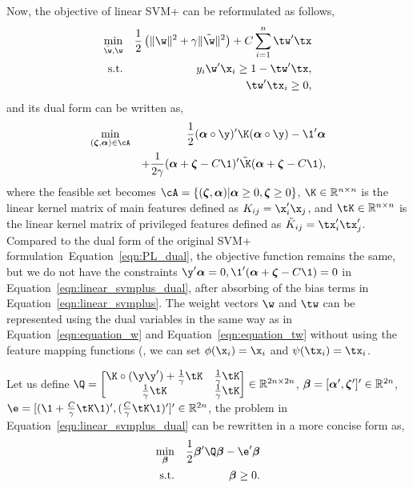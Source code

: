 Now, the objective of linear SVM+ can be reformulated as follows,
\begin{eqnarray}\label{eqn:linear_svmplus}
\min_{\tilde{\w}, \w} && \frac{1}{2}\left(\|\w\|^2 + \gamma\|\tilde{\w}\|^2\right)+ C\sum_{i=1}^{n}\tw'\tx\\
\mbox{s.t.} && y_i\w'\x_i \geq 1 - \tw'\tx,\nonumber\\
&& \tw'\tx_i \geq 0,\nonumber
\end{eqnarray}
and its dual form can be written as,
\begin{eqnarray}\label{eqn:linear_svmplus_dual}
\min_{(\bz, \ba) \in \cA} && \frac{1}{2}(\ba\circ\y)'\K(\ba\circ\y) -\1'\ba  \\
&&  + \frac{1}{2\gamma}(\ba + \bz - C\1)'\tilde{\K}(\ba + \bz - C\1),\nonumber
\end{eqnarray}
where the feasible set becomes $\cA = \{(\bz, \ba)| \ba \geq 0, \bz \geq 0\}$, $\K \in \bbR^{n\times n}$ is the linear kernel matrix of main features defined as $K_{ij} = \x_i'\x_j$, and $\tK\in \bbR^{n\times n}$ is the linear kernel matrix of privileged features defined as $\tilde{K}_{ij} = \tx_i'\tx_j'$. Compared to the dual form of the original SVM+ formulation~Equation~\ref{eqn:PL_dual}, the objective function remains the same, but we do not have the constraints $\y'\ba = 0, \1'(\ba+\bz-C\1) = 0$ in Equation~\ref{eqn:linear_svmplus_dual}, after absorbing of the bias terms in Equation~\ref{eqn:linear_svmplus}. The weight vectors $\w$ and $\tw$ can be represented using the dual variables in the same way as in Equation~\ref{eqn:equation_w} and Equation~\ref{eqn:equation_tw} without using the feature mapping functions (\ie, we can set $\phi(\x_i) = \x_i$ and $\psi(\tx_i) = \tx_i$.

Let us define $\Q = \begin{bmatrix}\K\circ(\y\y') + \frac{1}{\gamma}\tK & \frac{1}{\gamma}\tK\\ \frac{1}{\gamma}\tK & \frac{1}{\gamma}\tK\end{bmatrix} \in \bbR^{2n\times 2n}$, $\bm{\beta} = [\bm{\alpha}', \bm{\zeta}']' \in {\mathbb R}^{2n}$, $\e = [(\1+\frac{C}{\gamma}\tK\1)', (\frac{C}{\gamma}\tK\1)']' \in \bbR^{2n}$, the problem in Equation~\ref{eqn:linear_svmplus_dual} can be rewritten in a more concise form as,
\begin{eqnarray}
\min_{\bb} && \frac{1}{2}\bb'\Q\bb -\e'\bb\label{eqn:linear_svmplus_dual2}\\
\mbox{s.t.}&& \bb \geq 0.\nonumber
\end{eqnarray}

